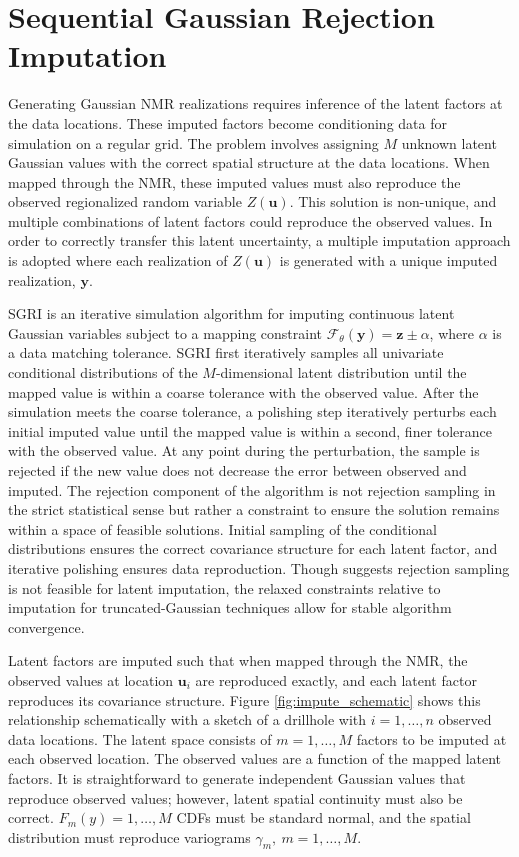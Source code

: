 \FloatBarrier
\section{Sequential Gaussian Rejection Imputation}
\label{sec:05sgri}

Generating Gaussian \gls{NMR} realizations requires inference of the latent factors at the data locations. These imputed factors become conditioning data for simulation on a regular grid. The problem involves assigning $M$ unknown latent Gaussian values with the correct spatial structure at the data locations. When mapped through the \gls{NMR}, these imputed values must also reproduce the observed regionalized random variable $Z(\mathbf{u})$. This solution is non-unique, and multiple combinations of latent factors could reproduce the observed values. In order to correctly transfer this latent uncertainty, a multiple imputation \citep{barnett2015multivariate} approach is adopted where each realization of $Z(\mathbf{u})$ is generated with a unique imputed realization, $\mathbf{y}$.

\Gls{SGRI} is an iterative simulation algorithm for imputing continuous latent Gaussian variables subject to a mapping constraint $\mathcal{F}_{\theta}\left(\mathbf{y}\right)=\mathbf{z} \pm \alpha$, where $\alpha$ is a data matching tolerance. \Gls{SGRI} first iteratively samples all univariate conditional distributions of the $M$-dimensional latent distribution until the mapped value is within a coarse tolerance with the observed value. After the simulation meets the coarse tolerance, a polishing step iteratively perturbs each initial imputed value until the mapped value is within a second, finer tolerance with the observed value. At any point during the perturbation, the sample is rejected if the new value does not decrease the error between observed and imputed. The rejection component of the algorithm is not rejection sampling in the strict statistical sense but rather a constraint to ensure the solution remains within a space of feasible solutions. Initial sampling of the conditional distributions ensures the correct covariance structure for each latent factor, and iterative polishing ensures data reproduction. Though \cite{armstrong2011plurigaussian} suggests rejection sampling is not feasible for latent imputation, the relaxed constraints relative to imputation for truncated-Gaussian techniques allow for stable algorithm convergence.

Latent factors are imputed such that when mapped through the \gls{NMR}, the observed values at location $\mathbf{u}_{i}$ are reproduced exactly, and each latent factor reproduces its covariance structure. Figure \ref{fig:impute_schematic} shows this relationship schematically with a sketch of a drillhole with $i=1,\dots,n$ observed data locations. The latent space consists of $m=1,\dots,M$ factors to be imputed at each observed location. The observed values are a function of the mapped latent factors. It is straightforward to generate independent Gaussian values that reproduce observed values; however, latent spatial continuity must also be correct. $F_{m}(y)=1,\dots,M$ \glspl{CDF} must be standard normal, and the spatial distribution must reproduce variograms $\gamma_{m}, \ m=1,\dots,M$.

